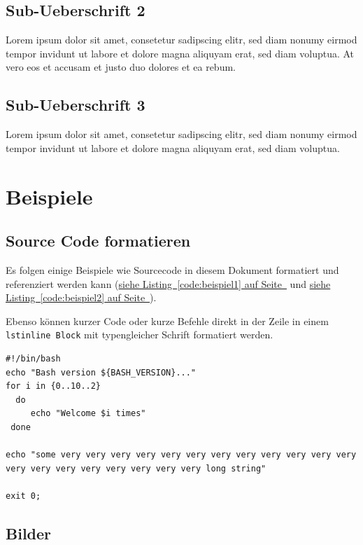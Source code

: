 \documentclass[12pt,a4paper,titlepage,oneside]{scrartcl}
\begin{document}
\subsection{Sub-Ueberschrift 2}
Lorem ipsum dolor sit amet, consetetur sadipscing elitr, sed diam nonumy eirmod tempor invidunt ut labore et dolore magna aliquyam erat, sed diam voluptua. At vero eos et accusam et justo duo dolores et ea rebum. 

\subsection{Sub-Ueberschrift 3}
Lorem ipsum dolor sit amet, consetetur sadipscing elitr, sed diam nonumy eirmod tempor invidunt ut labore et dolore magna aliquyam erat, sed diam voluptua. 

\section{Beispiele}

\subsection{Source Code formatieren}
Es folgen einige Beispiele wie Sourcecode in diesem Dokument formatiert und referenziert werden kann
(\hyperref[code:beispiel1]{siehe Listing~\ref*{code:beispiel1} auf Seite~\pageref*{code:beispiel1}} und \hyperref[code:beispiel2]{siehe Listing~\ref*{code:beispiel2} auf Seite~\pageref*{code:beispiel2}}).

Ebenso können kurzer Code oder kurze Befehle direkt in der Zeile in einem \lstinline{lstinline Block} mit typengleicher Schrift formatiert werden.



\begin{lstlisting}[caption=Example bash script,label=code:beispiel2,style=simple]
#!/bin/bash
echo "Bash version ${BASH_VERSION}..."
for i in {0..10..2}
  do
     echo "Welcome $i times"
 done

echo "some very very very very very very very very very very very very very very very very very very very very long string"

exit 0;
\end{lstlisting}

\subsection{Bilder}
\end{document}
